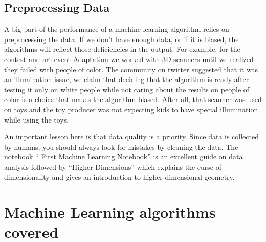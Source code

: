 \documentclass[11pt,letterpaper]{report}
\begin{document}
	\subsection{Preprocessing Data}

	
	 A big part of the performance of a machine learning algorithm relies on preprocessing the data. If we don't have enough data, or if it is biased, the algorithms will reflect those deficiencies in the output. For example, for the contest and 	 \href{	  http://agile-iot.eu/adaptation/}{art event Adaptation}\cite{wadaptation} we 
	 \href{	 https://www.sciartmagazine.com/straight-talk-justus-harris.html}{ worked with 3D-scanners}\cite{wexhibition} 
	  until we realized they failed with people of color. The community on twitter suggested that it was an illumination issue, we claim that deciding that the algorithm is ready after testing it only on white people while not caring about the results on people of color is a choice that makes the algorithm biased. After all, that scanner was used on toys and the toy producer was not expecting kids to have special illumination while using the toys.
	 
	 An important lesson here is that \href{ https://www.quora.com/In-machine-learning-is-more-data-always-better-than-better-algorithms}{data quality}\cite{wdata} is a priority. 
	 Since data is collected by humans, you should always look for mistakes by cleaning the data. The  notebook `` First Machine Learning Notebook'' is an excellent guide on data analysis followed by ``Higher Dimensions'' which explains the curse of dimensionality and gives an introduction to higher dimensional geometry. 
	  
 	\section{Machine Learning algorithms covered}
 	
 	
 	
\end{document}
